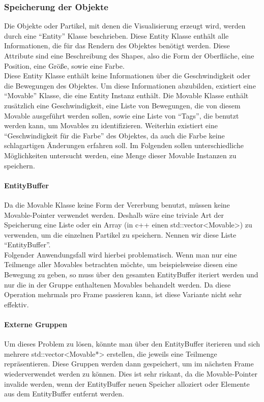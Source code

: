 \documentclass[11pt,a4paper]{article}
\begin{document}
\subsubsection{Speicherung der Objekte}
Die Objekte oder Partikel, mit denen die Visualisierung erzeugt wird, werden durch eine ``Entity'' Klasse beschrieben. Diese Entity Klasse enthält alle Informationen, die für das Rendern des Objektes benötigt werden. Diese Attribute sind eine Beschreibung des Shapes, also die Form der Oberfläche, eine Position, eine Größe, sowie eine Farbe.\\
Diese Entity Klasse enthält keine Informationen über die Geschwindigkeit oder die Bewegungen des Objektes. Um diese Informationen abzubilden, existiert eine ``Movable'' Klasse, die eine Entity Instanz enthält. Die Movable Klasse enthält zusätzlich eine Geschwindigkeit, eine Liste von Bewegungen, die von diesem Movable ausgeführt werden sollen, sowie eine Liste von ``Tags'', die benutzt werden kann, um Movables zu identifizieren. Weiterhin existiert eine ``Geschwindigkeit für die Farbe''  des Objektes, da auch die Farbe keine schlagartigen Änderungen erfahren soll. Im Folgenden sollen unterschiedliche Möglichkeiten untersucht werden, eine Menge dieser Movable Instanzen zu speichern.
\paragraph{EntityBuffer}
Da die Movable Klasse keine Form der Vererbung benutzt, müssen keine Movable-Pointer verwendet werden. Deshalb wäre eine triviale Art der Speicherung eine Liste oder ein Array (in c++ einen std::vector<Movable>) zu verwenden, um die einzelnen Partikel zu speichern. Nennen wir diese Liste ``EntityBuffer''.\\
Folgender Anwendungsfall wird hierbei problematisch. Wenn man nur eine Teilmenge aller Movables betrachten möchte, um beispielsweise diesen eine Bewegung zu geben, so muss über den gesamten EntityBuffer iteriert werden und nur die in der Gruppe enthaltenen Movables behandelt werden. Da diese Operation mehrmals pro Frame passieren kann, ist diese Variante nicht sehr effektiv.
\paragraph{Externe Gruppen}
Um dieses Problem zu lösen, könnte man über den EntityBuffer iterieren und sich mehrere std::vector<Movable*> erstellen, die jeweils eine Teilmenge repräsentieren. Diese Gruppen werden dann gespeichert, um im nächsten Frame wiederverwendet werden zu können. Dies ist sehr riskant, da die Movable-Pointer invalide werden, wenn der EntityBuffer neuen Speicher alloziert oder Elemente aus dem EntityBuffer entfernt werden.
\end{document}
